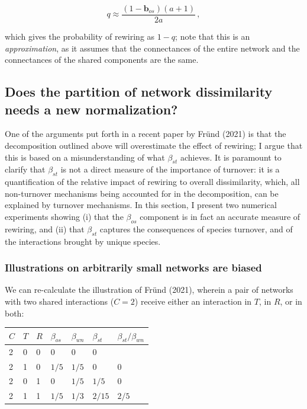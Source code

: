 \documentclass[10pt,oneside]{article}
\begin{document}
\[q \approx \frac{(1-\mathbf{b}_{os})(a+1)}{2a}\,,\]

which gives the probability of rewiring as \(1-q\); note that this is an
\emph{approximation}, as it assumes that the connectances of the entire
network and the connectances of the shared components are the same.

\hypertarget{does-the-partition-of-network-dissimilarity-needs-a-new-normalization}{%
\subsection{Does the partition of network dissimilarity needs a new
normalization?}\label{does-the-partition-of-network-dissimilarity-needs-a-new-normalization}}

One of the arguments put forth in a recent paper by Fründ (2021) is that
the decomposition outlined above will overestimate the effect of
rewiring; I argue that this is based on a misunderstanding of what
\(\beta_{st}\) achieves. It is paramount to clarify that \(\beta_{st}\)
is not a direct measure of the importance of turnover: it is a
quantification of the relative impact of rewiring to overall
dissimilarity, which, all non-turnover mechanisms being accounted for in
the decomposition, can be explained by turnover mechanisms. In this
section, I present two numerical experiments showing (i) that the
\(\beta_{os}\) component is in fact an accurate measure of rewiring, and
(ii) that \(\beta_{st}\) captures the consequences of species turnover,
and of the interactions brought by unique species.

\hypertarget{illustrations-on-arbitrarily-small-networks-are-biased}{%
\subsubsection{Illustrations on arbitrarily small networks are
biased}\label{illustrations-on-arbitrarily-small-networks-are-biased}}

We can re-calculate the illustration of Fründ (2021), wherein a pair of
networks with two shared interactions (\(C = 2\)) receive either an
interaction in \(T\), in \(R\), or in both:

\begin{longtable}[]{@{}lllllll@{}}
\toprule
\(C\) & \(T\) & \(R\) & \(\beta_{os}\) & \(\beta_{wn}\) & \(\beta_{st}\)
& \(\beta_{st}/\beta_{wn}\)\tabularnewline
\midrule
\endhead
2 & 0 & 0 & 0 & 0 & 0 &\tabularnewline
2 & 1 & 0 & \(1/5\) & \(1/5\) & 0 & 0\tabularnewline
2 & 0 & 1 & 0 & \(1/5\) & \(1/5\) & 0\tabularnewline
2 & 1 & 1 & \(1/5\) & \(1/3\) & \(2/15\) & \(2/5\)\tabularnewline
\bottomrule
\end{longtable}
\end{document}
